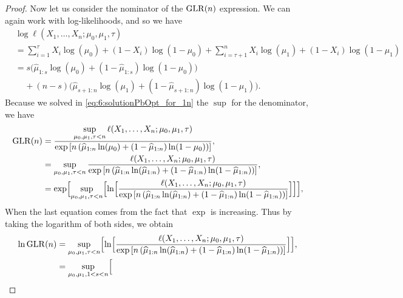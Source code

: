 \begin{proof}
    Now let us consider the nominator of the $\mathrm{GLR}(n)$ expression.
    We can again work with log-likelihoods, and so we have
    \begin{align*}
        & \log\ell(X_1, \ldots, X_n ; \mu_0,\mu_1,\tau) \\
        &= \sum_{i=1}^{\tau} X_i \log(\mu_0) + (1-X_i) \log(1-\mu_0) + \sum_{i=\tau+1}^n X_i \log(\mu_1) + (1-X_i) \log(1-\mu_1) \\
        &= s \bigl( \widehat{\mu}_{1:s} \log(\mu_0) + (1 - \widehat{\mu}_{1:s}) \log(1-\mu_0) \bigr) \\
        & \;\;\;\; + (n-s) \bigl( \widehat{\mu}_{s+1:n} \log(\mu_1) + (1 - \widehat{\mu}_{s+1:n}) \log(1-\mu_1) \bigr).
    \end{align*}
    Because we solved in \eqref{eq:6:solutionPbOpt_for_1n} the $\sup$ for the denominator,
    we have
    \begin{align*}
        \mathrm{GLR}(n)
        &= \frac{\sup\limits_{\mu_0,\mu_1,\tau < n}\ell(X_1, \ldots, X_n ; \mu_0,\mu_1,\tau)}{ \exp\left[ n \left( \widehat{\mu}_{1:n} \ln(\mu_0) + (1 - \widehat{\mu}_{1:n}) \ln(1-\mu_0) \right) \right] }, \\
        &= \sup\limits_{\mu_0,\mu_1,\tau < n} \frac{\ell(X_1, \ldots, X_n ; \mu_0,\mu_1,\tau)}{ \exp\left[ n \left( \widehat{\mu}_{1:n} \ln(\widehat{\mu}_{1:n}) + (1 - \widehat{\mu}_{1:n}) \ln(1-\widehat{\mu}_{1:n}) \right) \right] }, \\
        &= \exp \Bigl[ \sup\limits_{\mu_0,\mu_1,\tau < n} \Bigl[ \ln\Bigl[ \frac{\ell(X_1, \ldots, X_n ; \mu_0,\mu_1,\tau)}{ \exp\left[ n \left( \widehat{\mu}_{1:n} \ln(\widehat{\mu}_{1:n}) + (1 - \widehat{\mu}_{1:n}) \ln(1-\widehat{\mu}_{1:n}) \right) \right] } \Bigr] \Bigr] \Bigr],
    \end{align*}
    When the last equation comes from the fact that $\exp$ is increasing.
    Thus by taking the logarithm of both sides, we obtain
    \begin{align*}
        \log \GLR(n)
        &= \sup\limits_{\mu_0,\mu_1,\tau < n} \Bigl[ \log\Bigl[ \frac{\ell(X_1, \ldots, X_n ; \mu_0,\mu_1,\tau)}{ \exp\left[ n \left( \widehat{\mu}_{1:n} \log(\widehat{\mu}_{1:n}) + (1 - \widehat{\mu}_{1:n}) \log(1-\widehat{\mu}_{1:n}) \right) \right] } \Bigr] \Bigr],  \\
        &= \sup\limits_{\mu_0,\mu_1, 1 < s < n} \Bigl[

\end{align*}
\end{proof}
